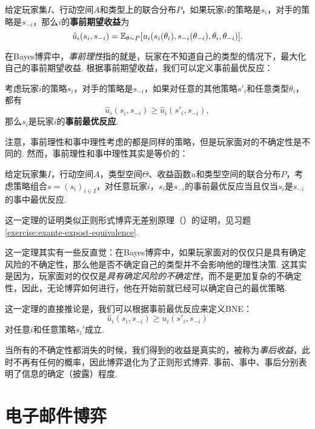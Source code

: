 \begin{definition}[事前期望收益]
    给定玩家集$I$、行动空间$A$和类型上的联合分布$P$，如果玩家$i$的策略是$s_i$，对手的策略是$s_{-i}$，那么$i$的\textbf{事前期望收益}为
\[\hat u_i(s_i,s_{-i})=\mathbb{E}_{\theta\sim P}[u_i(s_i(\theta_i),s_{-i}(\theta_{-i}),\theta_i,\theta_{-i})].\]
\end{definition}

在Bayes博弈中，\textit{事前理性}指的就是，玩家在不知道自己的类型的情况下，最大化自己的事前期望收益. 根据事前期望收益，我们可以定义事前最优反应：

\begin{definition}[事前最优反应]
    考虑玩家$i$的策略$s_i$，对手的策略是$s_{-i}$，如果对任意的其他策略$s'_i$和任意类型$\theta_i$，都有
    \[\hat u_i(s_i,s_{-i})\geq \hat u_i(s'_i,s_{-i}),\]
    那么$s_i$是玩家$i$的\textbf{事前最优反应}.
\end{definition}

注意，事前理性和事中理性考虑的都是同样的策略，但是玩家面对的不确定性是不同的. 然而，事前理性和事中理性其实是等价的：

\begin{theorem}\label{thm:exante-expost-equivalence}
    给定玩家集$I，$行动空间$A$，类型空间$\Theta$、收益函数$u$和类型空间的联合分布$P$，考虑策略组合$s=(s_i)_{i\in I}$，对任意玩家$i$，$s_i$是$s_{-i}$的事前最优反应当且仅当$s_i$是$s_{-i}$的事中最优反应.
\end{theorem}

这一定理的证明类似正则形式博弈无差别原理（）的证明，见习题 \ref{exercise:exante-expost-equivalence}.

这一定理其实有一些反直觉：在Bayes博弈中，如果玩家面对的仅仅只是具有确定风险的不确定性，那么他是否不确定自己的类型并不会影响他的理性决策. 这其实是因为，玩家面对的仅仅是\textit{具有确定风险的不确定性}，而不是更加复杂的不确定性，因此，无论博弈如何进行，他在开始前就已经可以确定自己的最优策略.

这一定理的直接推论是，我们可以根据事前最优反应来定义BNE：
     \[\hat u_i(s_i,s_{-i})\geq u_i(s'_i,s_{-i})\]
对任意$i$和任意策略$s_i'$成立.

当所有的不确定性都消失的时候，我们得到的收益是真实的，被称为\textit{事后收益}，此时不再有任何的概率，因此博弈退化为了正则形式博弈. 事前、事中、事后分别表明了信息的确定（披露）程度. 

\section{电子邮件博弈}\label{sec:emailing-game}

